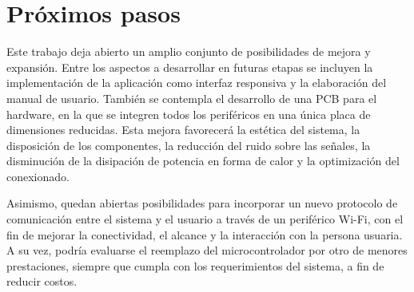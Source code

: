 \section{Próximos pasos}

Este trabajo deja abierto un amplio conjunto de posibilidades de mejora y expansión. Entre los aspectos a desarrollar en futuras etapas se incluyen la implementación de la aplicación como interfaz responsiva y la elaboración del manual de usuario. También se contempla el desarrollo de una PCB para el hardware, en la que se integren todos los periféricos en una única placa de dimensiones reducidas. Esta mejora favorecerá la estética del sistema, la disposición de los componentes, la reducción del ruido sobre las señales, la disminución de la disipación de potencia en forma de calor y la optimización del conexionado.

Asimismo, quedan abiertas posibilidades para incorporar un nuevo protocolo de comunicación entre el sistema y el usuario a través de un periférico Wi-Fi, con el fin de mejorar la conectividad, el alcance y la interacción con la persona usuaria. A su vez, podría evaluarse el reemplazo del microcontrolador por otro de menores prestaciones, siempre que cumpla con los requerimientos del sistema, a fin de reducir costos.